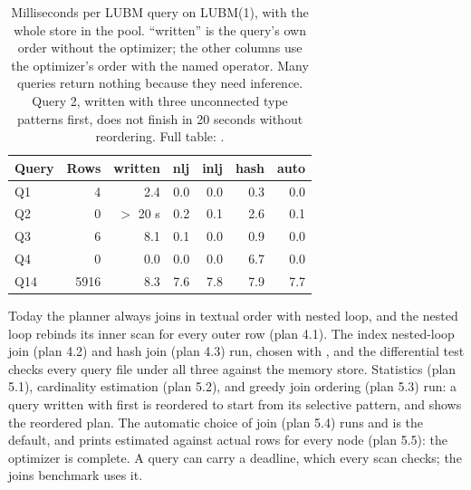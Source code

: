 \begin{table}[ht]
\centering
\small
\begin{tabular}{@{}lrrrrrr@{}}
\toprule
Query & Rows & written & nlj & inlj & hash & auto \\
\midrule
Q1 & 4 & 2.4 & 0.0 & 0.0 & 0.3 & 0.0 \\
Q2 & 0 & $>$ 20 s & 0.2 & 0.1 & 2.6 & 0.1 \\
Q3 & 6 & 8.1 & 0.1 & 0.0 & 0.9 & 0.0 \\
Q4 & 0 & 0.0 & 0.0 & 0.0 & 6.7 & 0.0 \\
Q14 & 5916 & 8.3 & 7.6 & 7.8 & 7.9 & 7.7 \\
\bottomrule
\end{tabular}
\caption{Milliseconds per LUBM query on LUBM(1), with the whole store in the
pool. ``written'' is the query's own order without the optimizer; the other
columns use the optimizer's order with the named operator. Many queries return
nothing because they need inference. Query 2, written with three unconnected
type patterns first, does not finish in 20 seconds without reordering. Full
table: .}
\label{tab:joinbench}
\end{table}

\begin{status}
Today the planner always joins in textual order with nested loop, and the
nested loop rebinds its inner scan for every outer row (plan 4.1). The index
nested-loop join (plan 4.2) and hash join (plan 4.3) run, chosen with
, and the differential test checks every query
file under all three against the memory store. Statistics (plan 5.1), cardinality estimation (plan 5.2), and greedy join
ordering (plan 5.3) run: a query written with  first is
reordered to start from its selective pattern, and  shows the reordered plan. The automatic choice of join (plan 5.4)
runs and is the default, and  prints
estimated against actual rows for every node (plan 5.5): the optimizer is
complete. A query can carry a deadline, which every scan checks; the joins
benchmark uses it.
\end{status}

